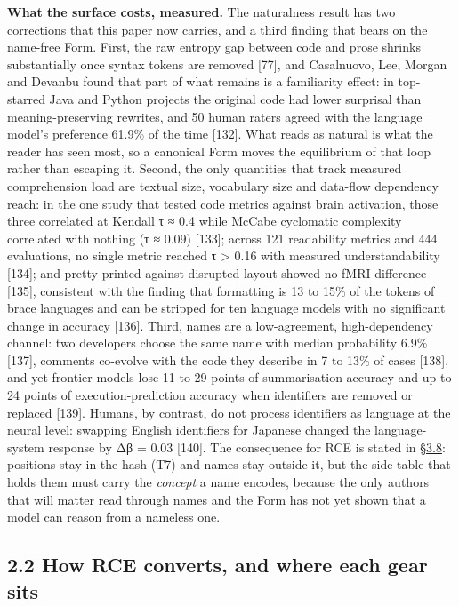 \documentclass[10pt,letterpaper]{article}
\begin{document}
\textbf{What the surface costs, measured.} The naturalness result has
two corrections that this paper now carries, and a third finding that
bears on the name-free Form. First, the raw entropy gap between code and
prose shrinks substantially once syntax tokens are removed {[}77{]}, and
Casalnuovo, Lee, Morgan and Devanbu found that part of what remains is a
familiarity effect: in top-starred Java and Python projects the original
code had lower surprisal than meaning-preserving rewrites, and 50 human
raters agreed with the language model's preference 61.9\% of the time
{[}132{]}. What reads as natural is what the reader has seen most, so a
canonical Form moves the equilibrium of that loop rather than escaping
it. Second, the only quantities that track measured comprehension load
are textual size, vocabulary size and data-flow dependency reach: in the
one study that tested code metrics against brain activation, those three
correlated at Kendall τ ≈ 0.4 while McCabe cyclomatic complexity
correlated with nothing (τ ≈ 0.09) {[}133{]}; across 121 readability
metrics and 444 evaluations, no single metric reached
\textbar τ\textbar{} \textgreater{} 0.16 with measured understandability
{[}134{]}; and pretty-printed against disrupted layout showed no fMRI
difference {[}135{]}, consistent with the finding that formatting is 13
to 15\% of the tokens of brace languages and can be stripped for ten
language models with no significant change in accuracy {[}136{]}. Third,
names are a low-agreement, high-dependency channel: two developers
choose the same name with median probability 6.9\% {[}137{]}, comments
co-evolve with the code they describe in 7 to 13\% of cases {[}138{]},
and yet frontier models lose 11 to 29 points of summarisation accuracy
and up to 24 points of execution-prediction accuracy when identifiers
are removed or replaced {[}139{]}. Humans, by contrast, do not process
identifiers as language at the neural level: swapping English
identifiers for Japanese changed the language-system response by Δβ =
0.03 {[}140{]}. The consequence for RCE is stated in
\href{https://research.openie.dev/papers/rce/\#38-behaviour-equivalence-and-dimension}{§3.8}:
positions stay in the hash (T7) and names stay outside it, but the side
table that holds them must carry the \emph{concept} a name encodes,
because the only authors that will matter read through names and the
Form has not yet shown that a model can reason from a nameless one.

\subsection{2.2 How RCE converts, and where each gear
sits}\label{how-rce-converts-and-where-each-gear-sits}
\end{document}
